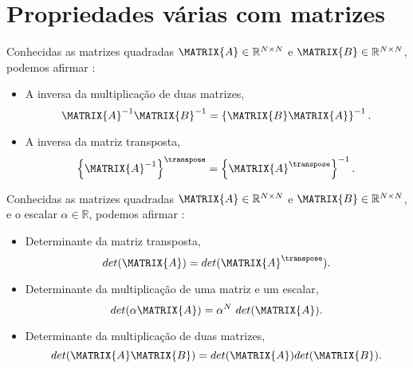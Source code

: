 \section{Propriedades várias com matrizes}


\begin{theorem}\label{theo:matrixgeneric2}
Conhecidas as matrizes quadradas $\MATRIX{A} \in \mathbb{R}^{N \times N}$ e $\MATRIX{B} \in \mathbb{R}^{N \times N}$,
podemos afirmar \cite[pp. 65]{golub2013matrix}:
\begin{itemize}
\item  A inversa da multiplicação de duas matrizes,
\begin{equation}
\MATRIX{A}^{-1} \MATRIX{B}^{-1} = \left\{\MATRIX{B}\MATRIX{A}\right\}^{-1}.
\end{equation}
\item A inversa da matriz transposta,
\begin{equation}
\left\{\MATRIX{A}^{-1}\right\}^{\transpose}  = \left\{\MATRIX{A}^{\transpose}\right\}^{-1}.
\end{equation}
\end{itemize}
\end{theorem}

\begin{theorem}\label{theo:matrixgeneric1}
Conhecidas as matrizes quadradas $\MATRIX{A} \in \mathbb{R}^{N \times N}$ e $\MATRIX{B} \in \mathbb{R}^{N \times N}$,
e o escalar $\alpha \in \mathbb{R}$, podemos afirmar \cite[pp. 66]{golub2013matrix}:
\begin{itemize}
\item Determinante da matriz transposta,
\begin{equation}
det(\MATRIX{A})=det(\MATRIX{A}^{\transpose}).
\end{equation}
\item Determinante da multiplicação de uma matriz e um escalar,
\begin{equation}
det(\alpha \MATRIX{A})=\alpha^N~det(\MATRIX{A}).
\end{equation}
\item Determinante da multiplicação de duas matrizes,
\begin{equation}
det(\MATRIX{A}\MATRIX{B})=det(\MATRIX{A})det(\MATRIX{B}).
\end{equation}
\end{itemize}
\end{theorem}


